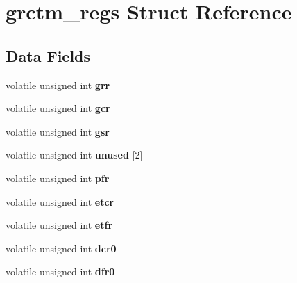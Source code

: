 \hypertarget{structgrctm__regs}{}\section{grctm\+\_\+regs Struct Reference}
\label{structgrctm__regs}
\subsection*{Data Fields}
\begin{DoxyCompactItemize}
\item 
\mbox{\label{structgrctm__regs_a8813964d195c7b1d6f2e736ade6e46b0}} 
volatile unsigned int {\bfseries grr}
\item 
\mbox{\label{structgrctm__regs_ade61ccbb98a7d18f94768fa77eeb6e28}} 
volatile unsigned int {\bfseries gcr}
\item 
\mbox{\label{structgrctm__regs_aa04ae8c866cf33ade2e1de15ece8d6c8}} 
volatile unsigned int {\bfseries gsr}
\item 
\mbox{\label{structgrctm__regs_a8a37e90e612e930ecefc459f25ef7114}} 
volatile unsigned int {\bfseries unused} \mbox{[}2\mbox{]}
\item 
\mbox{\label{structgrctm__regs_acd1983d7375fc5d12f66e2b2c9ba577a}} 
volatile unsigned int {\bfseries pfr}
\item 
\mbox{\label{structgrctm__regs_a015dc631c34813a711f6f4012aaa8d52}} 
volatile unsigned int {\bfseries etcr}
\item 
\mbox{\label{structgrctm__regs_a7ace73842ce0ca864f59669c0179d4f2}} 
volatile unsigned int {\bfseries etfr}
\item 
\mbox{\label{structgrctm__regs_a5a7c45df08a523a7758bd3d262778730}} 
volatile unsigned int {\bfseries dcr0}
\item 
\mbox{\label{structgrctm__regs_abff67941774308f3f45e829a9dfb0dab}} 
volatile unsigned int {\bfseries dfr0}
\item 
\mbox{\label{structgrctm__regs_ad6d01f75ce633495ae0ce969c733fb68}} 

\end{DoxyCompactItemize}
